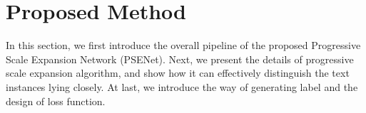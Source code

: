 \documentclass[10pt,twocolumn,letterpaper]{article}
\begin{document}
	
	\section{Proposed Method}
	In this section, we first introduce the overall pipeline of the proposed Progressive Scale Expansion Network (PSENet). Next, we present the details of progressive scale expansion algorithm, and show how it can effectively distinguish the text instances lying closely. At last, we introduce the way of generating label and the design of loss function.
	
\end{document}
